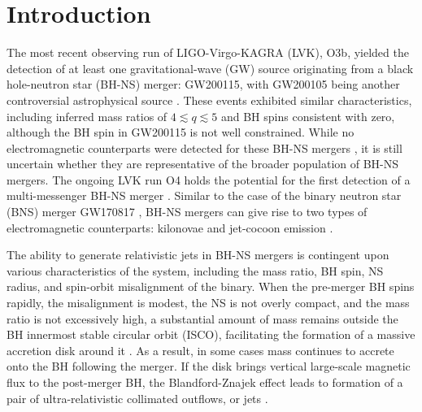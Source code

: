 \documentclass[twocolumn,dvipsnames]{aastex62}
\begin{document}
\section{Introduction}\label{sec:introduction}

The most recent observing run of LIGO-Virgo-KAGRA (LVK), O3b, yielded the detection of at least one gravitational-wave (GW) source originating from a black hole-neutron star (BH-NS) merger: GW200115, with GW200105 being another controversial astrophysical source \citep{Abbott2021}. These events exhibited similar characteristics, including inferred mass ratios of $4 \lesssim q \lesssim 5$ and BH spins consistent with zero, although the BH spin in GW200115 is not well constrained. While no electromagnetic counterparts were detected for these BH-NS mergers \citep{Dichiara2021,Zhu2021}, it is still uncertain whether they are representative of the broader population of BH-NS mergers. The ongoing LVK run O4 holds the potential for the first detection of a multi-messenger BH-NS merger \citep{Abbott2020}. Similar to the case of the binary neutron star (BNS) merger GW170817 \citep[see][for reviews]{Nakar2019,Margutti2021}, BH-NS mergers can give rise to two types of electromagnetic counterparts: kilonovae and jet-cocoon emission \citep[e.g.,][]{Paczynski1991,Mochkovitch1993,Janka1999,Rosswog2005,Surman2008,Metzger2010,Tanaka2014,Fernandez2015,Fernandez2017,Foucart2015,Kawaguchi2016,Darbha2021,Wanajo2022,Ekanger2023,Gompertz2023}.

The ability to generate relativistic jets in BH-NS mergers is contingent upon various characteristics of the system, including the mass ratio, BH spin, NS radius, and spin-orbit misalignment of the binary. When the pre-merger BH spins rapidly, the misalignment is modest, the NS is not overly compact, and the mass ratio is not excessively high, a substantial amount of mass remains outside the BH innermost stable circular orbit (ISCO), facilitating the formation of a massive accretion disk around it \citep{Shibata2006,Shibata2007,Shibata2008,Shibata2011,Etienne2008,Rantsiou2008,Duez2010,Foucart2012a,Foucart2011,Foucart2012b,Foucart2014,Foucart2017,Foucart2019,Kyutoku2011,Kyutoku2013,Kawaguchi2015,Kyutoku2015,Hayashi2021}. As a result, in some cases mass continues to accrete onto the BH following the merger. If the disk brings vertical large-scale magnetic flux to the post-merger BH, the Blandford-Znajek effect leads to formation of a pair of ultra-relativistic collimated outflows, or jets \citep{Blandford1977}.
\end{document}
